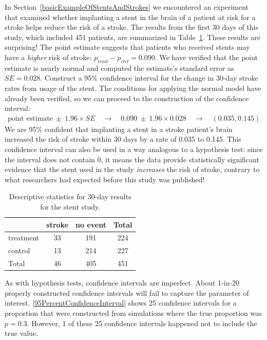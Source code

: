 \begin{example}{In Section~\ref{basicExampleOfStentsAndStrokes} we encountered an experiment that examined whether implanting a stent in the brain of a patient at risk for a stroke helps reduce the risk of a stroke. The results from the first 30 days of this study, which included 451 patients, are summarized in Table~\ref{stentStudyResultsCIsection}. These results are surprising! The point estimate suggests that patients who received stents may have a \emph{higher} risk of stroke: $p_{trmt} - p_{ctrl} = 0.090$. We have verified that the point estimate is nearly normal and computed the estimate's standard error as $SE = 0.028$. Construct a 95\% confidence interval for the change in 30-day stroke rates from usage of the stent.}
\label{stentStroke95CI_CIsection}
The conditions for applying the normal model have already been verified, so we can proceed to the construction of the confidence interval:
\begin{align*}
\text{point estimate}\ \pm\ 1.96 \times SE \quad \rightarrow \quad
0.090\ \pm\ 1.96 \times 0.028 \quad \rightarrow \quad
(0.035, 0.145)
\end{align*}
We are 95\% confident that implanting a stent in a stroke patient's brain increased the risk of stroke within 30 days by a rate of 0.035 to 0.145. This confidence interval can also be used in a way analogous to a hypothesis test: since the interval does not contain 0, it means the data provide statistically significant evidence that the stent used in the study \emph{increases} the risk of stroke, contrary to what researchers had expected before this study was published!
\end{example}

\begin{table}[h]
\centering
\begin{tabular}{l cc c}
  \hline
	& 	stroke 	& no event & Total \\
  \hline
treatment 	& 33		& 191	& 224 \\
control 	& 13		& 214	& 227 \\
  \hline
Total		& 46		& 405	& 451 \\
  \hline
\end{tabular}
\caption{Descriptive statistics for 30-day results for the stent study.}
\label{stentStudyResultsCIsection}
\end{table}

As with hypothesis tests, confidence intervals are imperfect. About 1-in-20 properly constructed confidence intervals will fail to capture the parameter of interest. \ref{95PercentConfidenceInterval} shows 25 confidence intervals for a proportion that were constructed from simulations where the true proportion was $p = 0.3$. However, 1 of these 25 confidence intervals happened not to include the true value.

